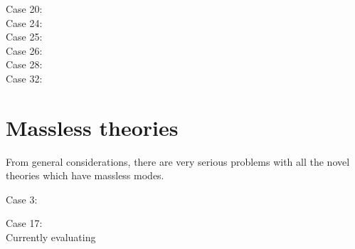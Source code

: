 \documentclass[aps,prd,reprint,preprintnumbers,superscriptaddress,showpacs,floatfix]{revtex4-2}
\begin{document}
Case 20:
\begin{equation}
  
  \label{<+label+>}
\end{equation}
Case 24:
\begin{equation}
  
  \label{<+label+>}
\end{equation}
Case 25:
\begin{equation}
  
  \label{<+label+>}
\end{equation}
Case 26:
\begin{equation}
  
  \label{<+label+>}
\end{equation}
Case 28:
\begin{equation}
  
  \label{<+label+>}
\end{equation}
Case 32:
\begin{equation}
  
  \label{<+label+>}
\end{equation}

\section{Massless theories}

From general considerations, there are very serious problems with all the novel theories which have massless modes.

Case 3:
\begin{equation}
  
  \label{<+label+>}
\end{equation}

Case 17:
\begin{equation}
  
  \label{<+label+>}
\end{equation}
Currently evaluating
\begin{equation}
  
  \label{<+label+>}
\end{equation}

\begin{acknowledgments}


\end{acknowledgments}



\end{document}
